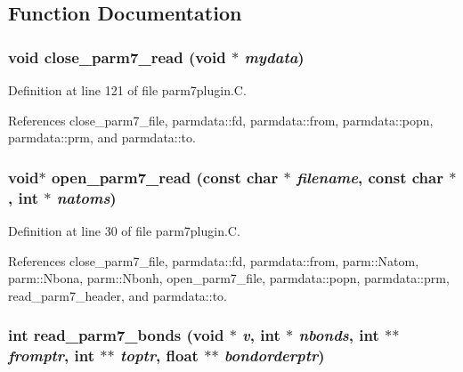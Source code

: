 \subsection{Function Documentation}
\subsubsection{\setlength{\rightskip}{0pt plus 5cm}void close\_\-parm7\_\-read (void $\ast$ {\em mydata})\hspace{0.3cm}{\tt  [static]}}\label{parm7plugin_8C_a4}




Definition at line 121 of file parm7plugin.C.

References close\_\-parm7\_\-file, parmdata::fd, parmdata::from, parmdata::popn, parmdata::prm, and parmdata::to.
\subsubsection{\setlength{\rightskip}{0pt plus 5cm}void$\ast$ open\_\-parm7\_\-read (const char $\ast$ {\em filename}, const char $\ast$, int $\ast$ {\em natoms})\hspace{0.3cm}{\tt  [static]}}\label{parm7plugin_8C_a1}




Definition at line 30 of file parm7plugin.C.

References close\_\-parm7\_\-file, parmdata::fd, parmdata::from, parm::Natom, parm::Nbona, parm::Nbonh, open\_\-parm7\_\-file, parmdata::popn, parmdata::prm, read\_\-parm7\_\-header, and parmdata::to.
\subsubsection{\setlength{\rightskip}{0pt plus 5cm}int read\_\-parm7\_\-bonds (void $\ast$ {\em v}, int $\ast$ {\em nbonds}, int $\ast$$\ast$ {\em fromptr}, int $\ast$$\ast$ {\em toptr}, float $\ast$$\ast$ {\em bondorderptr})\hspace{0.3cm}{\tt  [static]}}\label{parm7plugin_8C_a3}




